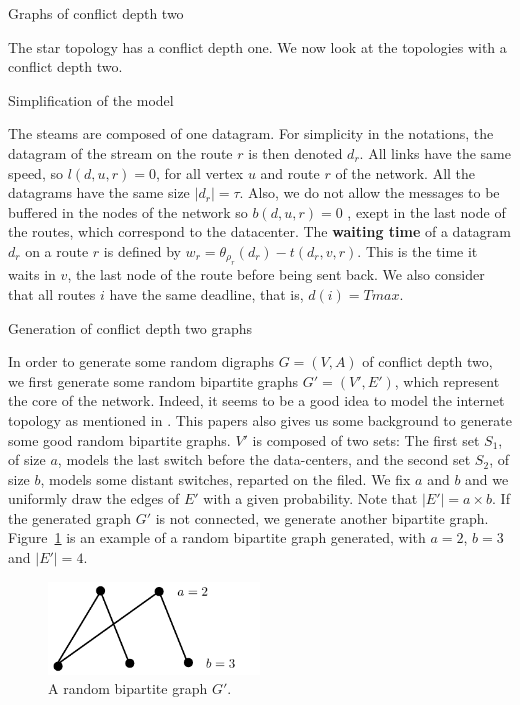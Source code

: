\documentclass[10pt]{article}
\begin{document}
\begin{section}{Graphs of conflict depth two}



The star topology has a conflict depth one. We now look at the topologies with a conflict depth two.
  

   \begin{subsection}{Simplification of the model}
 
   The steams are composed of one datagram. For simplicity in the notations, the datagram of the stream on the route $r$ is then denoted $d_r$. All links have the same speed, so $l(d,u,r)=0$, for all vertex $u$ and route $r$ of the network. All the datagrams have the same size $|d_r| = \tau$.
   Also, we do not allow the messages to be buffered in the nodes of the network so $b(d,u,r)=0$ , exept in the last node of the routes, which correspond to the datacenter.
   The \textbf{waiting time} of a datagram $d_r$ on a route $r$ is defined by $w_r = \theta_{\rho_r}(d_r) - t(d_r,v,r)$. This is the time it waits in $v$, the last node of the route before being sent back.
   We also consider that all routes $i$ have the same deadline, that is,  $d(i)= Tmax$.
   
  \end{subsection}
 


    \begin{subsection}{Generation of conflict depth two graphs}
    
     In order to generate some random digraphs $G=(V,A)$ of conflict depth two, we first generate some random bipartite graphs $G'=(V',E')$, which represent the core of the network. Indeed, it seems to be a good idea to model the internet topology as mentioned in \cite{tarissan_towards_2013}. This papers also gives us some background to generate some good random bipartite graphs. 
$V'$ is composed of two sets: The first set $S_1$, of size $a$, models the last switch before the data-centers, and the second set $S_2$, of size $b$, models some distant switches, reparted on the filed. We fix $a$ and $b$ and we uniformly draw the edges of $E'$ with a given probability. Note that $|E'|= a \times b$. If the generated graph  $G'$ is not connected, we generate another bipartite graph.
Figure~\ref{fig:random23} is an example of a random bipartite graph generated, with $a = 2$, $b=3$ and $|E'|=4$.

\begin{figure}[h]
\begin{center}
\includegraphics[width=0.5\textwidth]{random23}
\caption{A random bipartite graph $G'$.}\label{fig:random23}
\end{center}
\end{figure}



\end{subsection}
\end{section}
\end{document}
